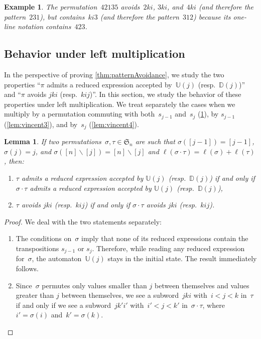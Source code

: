 \documentclass{amsart}
\newtheorem{lemma}[theorem]{Lemma}
\newtheorem{example}[theorem]{Example}
\newcommand{\fS}{\mathfrak{S}} %
\newcommand{\ssm}{\smallsetminus} %
\newcommand{\automatonU}{\mathbb{U}} %
\newcommand{\automatonD}{\mathbb{D}} %
\newcommand{\length}{\ell} %
\begin{document}
\begin{example}\label{exm:patternAvoidance}
	The permutation~$42135$ avoids~$2ki$, $3ki$, and~$4ki$ (and therefore the pattern~$231$), but contains~$ki3$ (and therefore the pattern~$312$) because its one-line notation contains~$423$. 
\end{example}

\subsection{Behavior under left multiplication}

In the perspective of proving \cref{thm:patternAvoidance}, we study the two properties ``$\pi$ admits a reduced expression accepted by~$\automatonU(j)$ (resp.~$\automatonD(j)$)'' and ``$\pi$ avoids $jki$ (resp.~$kij$)''.
In this section, we study the behavior of these properties under left multiplication.
We treat separately the cases when we multiply by a permutation commuting with both~$s_{j-1}$ and~$s_j$ (\cref{lem:vincent2}), by $s_{j-1}$ (\cref{lem:vincent3}), and by~$s_j$ (\cref{lem:vincent4}).

\begin{lemma}\label{lem:vincent2}
If two permutations~$\sigma, \tau \in \fS_n$ are such that $\sigma([j-1]) = [j-1]$, $\sigma(j) = j$, and $\sigma([n]\ssm [j]) = [n]\ssm [j]$ and $\length(\sigma \cdot \tau) = \length(\sigma) + \length(\tau)$, then:
\begin{enumerate}
	\item $\tau$ admits a reduced expression accepted by $\automatonU(j)$ (resp.~$\automatonD(j)$) if and only if $\sigma \cdot \tau$ admits a reduced expression accepted by $\automatonU(j)$ (resp.~$\automatonD(j)$),
	\item $\tau$ avoids $jki$ (resp.~$kij$) if and only if $\sigma \cdot \tau$ avoids $jki$ (resp.~$kij$).
\end{enumerate}
\end{lemma}

\begin{proof}
We deal with the two statements separately:
\begin{enumerate} 
	\item The conditions on~$\sigma$ imply that none of its reduced expressions contain the transpositions $s_{j-1}$ or $s_j$. Therefore, while reading any reduced expression for~$\sigma$, the automaton~$\automatonU(j)$ stays in the initial state. The result immediately follows.
	\item Since~$\sigma$ permutes only values smaller than $j$ between themselves and values greater than $j$ between themselves, we see a subword~$jki$ with~$i < j < k$ in~$\tau$ if and only if we see a subword~$jk'i'$ with~$i' < j < k'$ in~$\sigma \cdot \tau$, where~$i' = \sigma(i)$ and~$k' = \sigma(k)$.
	\qedhere
\end{enumerate}
\end{proof}
\end{document}
